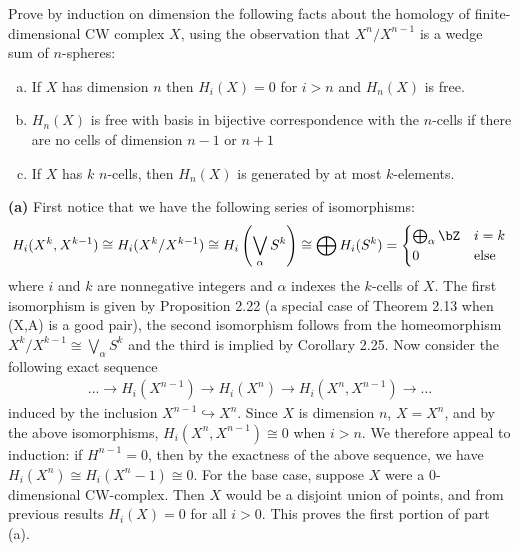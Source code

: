 \begin{homework}[e]
   Prove by induction on dimension the following facts about the homology of finite-dimensional CW complex $X$, using the observation that $X^n/X^{n-1}$ is a wedge sum of $n$-spheres:
  \begin{enumerate}[(a)]
    \item If $X$ has dimension $n$ then $H_i(X) = 0$ for $i > n$ and $H_n(X)$ is free.
    \item $H_n(X)$ is free with basis in bijective correspondence with the $n$-cells if there are no cells of dimension $n-1$ or $n+1$
    \item If $X$ has $k$ $n$-cells, then $H_n(X)$ is generated by at most $k$-elements.
  \end{enumerate}
  \begin{prf}
    \noindent \textbf{(a)}\hspace{1em} First notice that we have the following series of isomorphisms:
    \begin{align*}
      H_i(X^k,X^{k-1}) \cong H_i(X^k/X^{k-1}) \cong H_i\left(\bigvee_\alpha S^k\right) \cong \bigoplus H_i(S^k) =
      \begin{cases}
        \bigoplus_\alpha \bZ & i = k \\
        0 & \text{else}
      \end{cases}
    \end{align*}
    where $i$ and $k$ are nonnegative integers and $\alpha$ indexes the $k$-cells of $X$. The first isomorphism is given by Proposition 2.22 (a special case of Theorem 2.13 when (X,A) is a good pair), the second isomorphism follows from the homeomorphism $X^k/X^{k-1}\cong \bigvee_\alpha S^k$ and the third is implied by Corollary 2.25. Now consider the following exact sequence
    \begin{align*}
      ... \to H_i(X^{n-1}) \to H_i(X^n) \to H_i(X^n,X^{n-1}) \to ...
    \end{align*}
    induced by the inclusion $X^{n-1}\hookrightarrow X^n$. Since $X$ is dimension $n$, $X = X^n$, and by the above isomorphisms, $H_i(X^n,X^{n-1})\cong 0$ when $i > n$. We therefore appeal to induction: if $H^{n-1} = 0$, then by the exactness of the above sequence, we have $H_i(X^n)\cong H_i(X^n-1) \cong 0$. For the base case, suppose $X$ were a $0$-dimensional CW-complex. Then $X$ would be a disjoint union of points, and from previous results $H_i(X) = 0$ for all $i > 0$. This proves the first portion of part (a).


\end{prf}
\end{homework}
